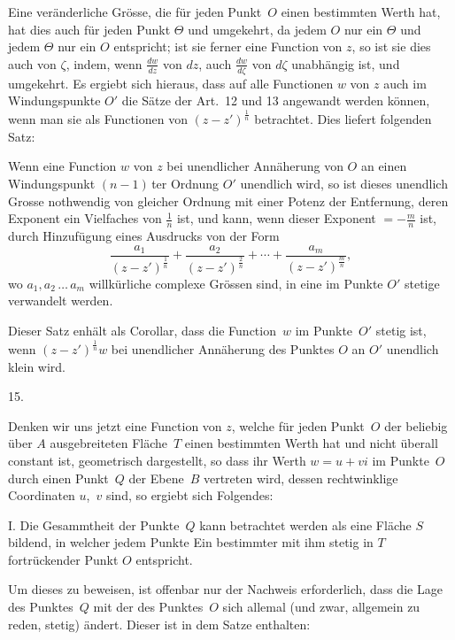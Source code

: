 \documentclass[a4paper,12pt]{article}
\begin{document}
Eine ver\"{a}nderliche Gr\"{o}sse, die f\"{u}r jeden Punkt~$O$
einen bestimmten Werth hat, hat dies auch f\"{u}r jeden Punkt
$\Theta$ und umgekehrt, da jedem $O$ nur ein $\Theta$ und jedem
$\Theta$ nur ein $O$ entspricht; ist sie ferner eine Function von
$z$, so ist sie dies auch von $\zeta$, indem, wenn
$\displaystyle \frac{dw}{dz}$
von $dz$, auch
$\displaystyle \frac{dw}{d\zeta}$
von $d\zeta$ unabh\"{a}ngig ist, und umgekehrt.  Es ergiebt sich
hieraus, dass auf alle Functionen $w$ von $z$ auch im
Windungspunkte $O'$ die S\"{a}tze der Art.~12 und 13 angewandt
werden k\"{o}nnen, wenn man sie als Functionen von
$\displaystyle (z - z')^{\frac{1}{n}}$
betrachtet.  Dies liefert folgenden Satz:

Wenn eine Function $w$ von $z$ bei unendlicher Ann\"{a}herung von
$O$ an einen Windungspunkt $(n - 1) \,$\-ter Ordnung $O'$ unendlich
wird, so ist dieses unendlich Grosse nothwendig von gleicher
Ordnung mit einer Potenz der Entfernung, deren Exponent ein
Vielfaches von
$\displaystyle \frac{1}{n}$
ist, und kann, wenn dieser Exponent
$\displaystyle = - \frac{m}{n}$
ist, durch Hinzuf\"{u}gung eines Ausdrucks von der Form
\[    \frac{a_1}{(z - z')^{\frac{1}{n}}}
    + \frac{a_2}{(z - z')^{\frac{2}{n}}} + \cdots
    + \frac{a_m}{(z - z')^{\frac{m}{n}}},\]
wo $a_1, a_2 \,\ldots\, a_m$ willk\"{u}rliche complexe
Gr\"{o}ssen sind, in eine im Punkte $O'$ stetige verwandelt
werden.

Dieser Satz enh\"{a}lt als Corollar, dass die Function~$w$ im
Punkte~$O'$ stetig ist, wenn
$\displaystyle (z - z')^{\frac{1}{n}} w$
bei unendlicher Ann\"{a}herung des Punktes $O$ an $O'$ unendlich
klein wird.

\medbreak

\centerline{15.}

\nobreak\medskip

Denken wir uns jetzt eine Function von $z$, welche f\"{u}r jeden
Punkt~$O$ der beliebig \"{u}ber $A$ ausgebreiteten Fl\"{a}che~$T$
einen bestimmten Werth hat und nicht \"{u}berall constant ist,
geometrisch dargestellt, so dass ihr Werth $w = u + vi$ im
Punkte~$O$ durch einen Punkt~$Q$ der Ebene~$B$ vertreten wird,
dessen rechtwinklige Coordinaten $u$,~$v$ sind, so ergiebt sich
Folgendes:

I.  Die Gesammtheit der Punkte~$Q$ kann betrachtet werden als
eine Fl\"{a}che $S$ bildend, in welcher jedem Punkte Ein
bestimmter mit ihm stetig in $T$ fortr\"{u}ckender Punkt $O$
entspricht.

Um dieses zu beweisen, ist offenbar nur der Nachweis
erforderlich, dass die Lage des Punktes~$Q$ mit der des
Punktes~$O$ sich allemal (und zwar, allgemein zu reden, stetig)
\"{a}ndert.  Dieser ist in dem Satze enthalten:
\end{document}
